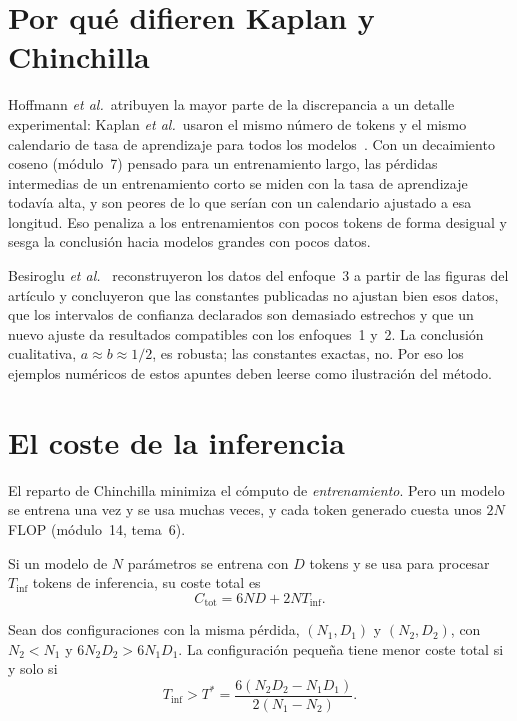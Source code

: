 \section{Por qué difieren Kaplan y Chinchilla}

Hoffmann \emph{et al.}\ atribuyen la mayor parte de la discrepancia a un detalle experimental: Kaplan \emph{et al.}\ usaron el mismo número de tokens y el mismo calendario de tasa de aprendizaje para todos los modelos~\cite[§2 y apéndice~B]{hoffmann}. Con un decaimiento coseno (módulo~7) pensado para un entrenamiento largo, las pérdidas intermedias de un entrenamiento corto se miden con la tasa de aprendizaje todavía alta, y son peores de lo que serían con un calendario ajustado a esa longitud. Eso penaliza a los entrenamientos con pocos tokens de forma desigual y sesga la conclusión hacia modelos grandes con pocos datos.

\begin{observacion}
Besiroglu \emph{et al.}~\cite{besiroglu} reconstruyeron los datos del enfoque~3 a partir de las figuras del artículo y concluyeron que las constantes publicadas no ajustan bien esos datos, que los intervalos de confianza declarados son demasiado estrechos y que un nuevo ajuste da resultados compatibles con los enfoques~1 y~2. La conclusión cualitativa, $a\approx b\approx 1/2$, es robusta; las constantes exactas, no. Por eso los ejemplos numéricos de estos apuntes deben leerse como ilustración del método.
\end{observacion}

\section{El coste de la inferencia}

El reparto de Chinchilla minimiza el cómputo de \emph{entrenamiento}. Pero un modelo se entrena una vez y se usa muchas veces, y cada token generado cuesta unos $2N$ FLOP (módulo~14, tema~6).

\begin{definicion}
Si un modelo de $N$ parámetros se entrena con $D$ tokens y se usa para procesar $T_{\mathrm{inf}}$ tokens de inferencia, su coste total es
\[
C_{\mathrm{tot}}=6ND+2NT_{\mathrm{inf}}.
\]
\end{definicion}

\begin{proposicion}\label{prop:amortizacion}
Sean dos configuraciones con la misma pérdida, $(N_1,D_1)$ y $(N_2,D_2)$, con $N_2<N_1$ y $6N_2D_2>6N_1D_1$. La configuración pequeña tiene menor coste total si y solo si
\[
T_{\mathrm{inf}}>T^{*}=\frac{6(N_2D_2-N_1D_1)}{2(N_1-N_2)}.
\]
\end{proposicion}

